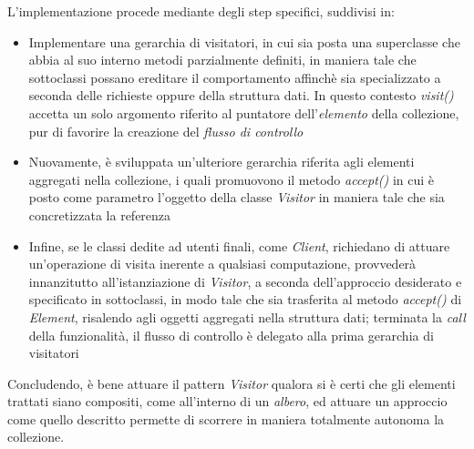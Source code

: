 \documentclass{article}
\begin{document}
L'implementazione procede mediante degli step specifici, suddivisi in:
\begin{itemize}[label={-}]
    \itemsep0em
    \item Implementare una gerarchia di visitatori, in cui sia posta una superclasse che abbia al suo interno metodi parzialmente definiti, in maniera tale che sottoclassi possano ereditare il comportamento affinchè sia specializzato a seconda delle richieste oppure della struttura dati. In questo contesto \textit{visit()} accetta un solo argomento riferito al puntatore dell'\textit{elemento} della collezione, pur di favorire la creazione del \textit{flusso di controllo}
    \item Nuovamente, è sviluppata un'ulteriore gerarchia riferita agli elementi aggregati nella collezione, i quali promuovono il metodo \textit{accept()} in cui è posto come parametro l'oggetto della classe \textit{Visitor} in maniera tale che sia concretizzata la referenza
    \item Infine, se le classi dedite ad utenti finali, come \textit{Client}, richiedano di attuare un'operazione di visita inerente a qualsiasi computazione, provvederà innanzitutto all'istanziazione di \textit{Visitor}, a seconda dell'approccio desiderato e specificato in sottoclassi, in modo tale che sia trasferita al metodo \textit{accept()} di \textit{Element}, risalendo agli oggetti aggregati nella struttura dati; terminata la \textit{call} della funzionalità, il flusso di controllo è delegato alla prima gerarchia di visitatori 
\end{itemize}
Concludendo, è bene attuare il pattern \textit{Visitor} qualora si è certi che gli elementi trattati siano compositi, come all'interno di un \textit{albero}, ed attuare un approccio come quello descritto permette di scorrere in maniera totalmente autonoma la collezione.
\end{document}
